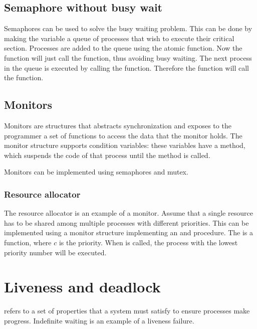 \subsection{Semaphore without busy wait}
Semaphores can be used to solve the busy waiting problem. This can be done by making the variable  a queue of processes that wish to execute their critical section. Processes are added to the queue using the  atomic function. Now the  function will just call the  function, thus avoiding busy waiting. The next process in the queue is executed by calling the  function. Therefore the  function will call the  function.

\subsection{Monitors}
Monitors are structures that abstracts synchronization and exposes to the programmer a set of functions to access the data that the monitor holds. 
The monitor structure supports condition variables: these variables have a  method, which suspends the code of that process until the  method is called.


Monitors can be implemented using semaphores and mutex.

\subsubsection{Resource allocator}
The resource allocator is an example of a monitor. Assume that a single resource has to be shared among multiple processes with different priorities. This can be implemented using a monitor structure implementing an  and  procedure. The  is a  function, where $c$ is the priority. When  is called, the process with the lowest priority number will be executed.

\section{Liveness and deadlock}
 refers to a set of properties that a system must satisfy to ensure processes make progress. Indefinite waiting is an example of a liveness failure.

